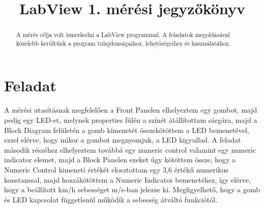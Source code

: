 \documentclass[10pt, conference,a4paper]{ITKproc}
\begin{document}
\title{LabView 1. mérési jegyzőkönyv}
\author{
}


\maketitle

\begin{abstract}
A mérés célja volt ismerkedni a LabView programmal. A feladatok megoldásával közelebb kerültünk a program tulajdonságaihoz, lehetőségeihez és használatához.
\end{abstract}

\IEEEpeerreviewmaketitle
\section{Feladat}
A mérési utasításnak megfelelően a Front Panelen elhelyeztem egy gombot, majd pedig egy LED-et, melynek properties fülén a színét átállítottam sárgára, majd a Block Diagram felületén a gomb kimenetét összekötöttem a LED bemenetével, ezzel elérve, hogy mikor a gombot megnyomjuk, a LED kigyullad. A feladat második részéhez elhelyeztem továbbá egy numeric control valamint egy numeric indicator elemet, majd a Block Panelen ezeket úgy kötöttem össze, hogy a Numeric Control kimeneti értékét elosztottam egy 3,6 értékű numerikus konstanssal, majd hozzákötöttem a Numeric Indicator bemenetéhez, így elérve, hogy a beállított km/h sebességet m/s-ban jelezze ki. Megfigyelhető, hogy a gomb és LED kapcsolat függetlenül működik a sebesség átváltó funkciótól. 
\end{document}
